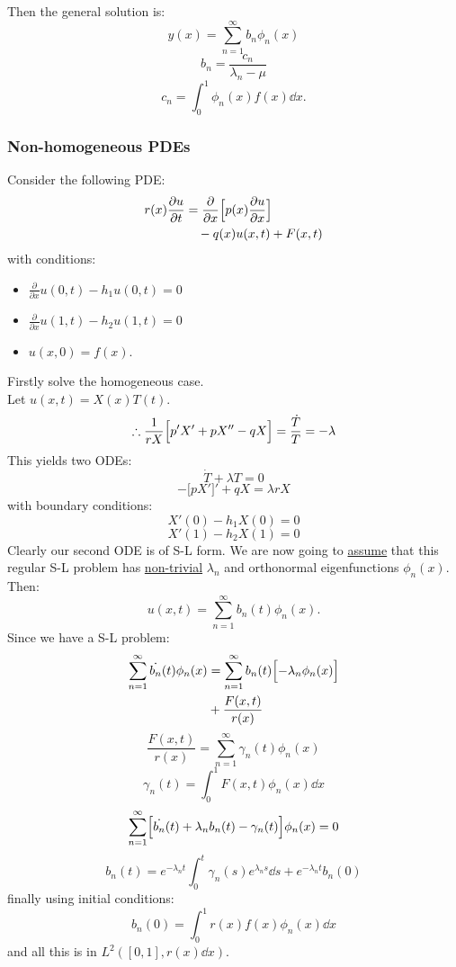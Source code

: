\documentclass{article}
\begin{document}
\begin{multicols}{3}
Then the general solution is:
$$y(x)=\sum_{n=1}^{\infty} b_n\phi_n(x)$$
$$b_n=\frac{c_n}{\lambda_n-\mu}$$
$$c_n=\int_{0}^{1}\phi_n(x)f(x)\dd x.$$

\subsubsection*{Non-homogeneous PDEs}
Consider the following PDE:
\begin{align*}
    r(x)\frac{\partial u}{\partial t}
    &=\frac{\partial}{\partial x}\Bigl[
    p(x)\frac{\partial u}{\partial x}
    \Bigr] \\
    &\quad-q(x)u(x,t)+F(x,t)
\end{align*}
with conditions:
\begin{itemize}
    \item $\displaystyle\frac{\partial}{\partial x}
    u(0,t)-h_1 u(0,t)=0$
    \item $\displaystyle\frac{\partial}{\partial x}
    u(1,t)-h_2 u(1,t)=0$
    \item $u(x,0)=f(x)$.
\end{itemize}
Firstly solve the homogeneous
case. \\ 
Let $u(x,t)=X(x)T(t)$.
$$\therefore\frac{1}{rX}\Bigl[p'X'+pX''
-qX\Bigr]=\frac{\dot{T}}{T}=-\lambda$$
This yields two ODEs:
$$\dot{T}+\lambda T=0$$
$$-\bigl[pX'\bigr]'+qX=\lambda rX$$
with boundary conditions:
$$X'(0)-h_1 X(0)=0$$
$$X'(1)-h_2 X(1)=0$$
Clearly our second ODE is of S-L form.
We are now going to \underline{assume} that this
regular S-L problem has \underline{non-trivial} $\lambda_n$
and orthonormal eigenfunctions $\phi_n(x)$. Then:
$$u(x,t)=\sum_{n=1}^{\infty}b_n(t)\phi_n(x).$$
Since we have a S-L problem:
\begin{align*} 
    \sum_{n=1}^{\infty}\dot{b_n}(t)\phi_n(x)
    &=\sum_{n=1}^{\infty}b_n(t)\Bigl[-\lambda_n\phi_n(x)\Bigr] \\
    &+\frac{F(x,t)}{r(x)}
\end{align*}
$$\frac{F(x,t)}{r(x)}=\sum_{n=1}^{\infty}\gamma_n(t)\phi_n(x)$$
$$\gamma_n(t)=\int_{0}^{1}F(x,t)\phi_n(x)\dd x$$
$$\sum_{n=1}^{\infty}\Bigl[\dot{b_n}(t)
+\lambda_n b_n(t)-\gamma_n(t)\Bigr]\phi_n(x)=0$$
$$b_n(t)=e^{-\lambda_n t}
\int_{0}^{t}\gamma_n(s)e^{\lambda_n s}\dd s
+e^{-\lambda_n t}b_n(0)$$
finally using initial conditions:
$$b_n(0)=\int_{0}^{1}r(x)f(x)\phi_n(x)\dd x$$
and all this is in $L^2([0,1],r(x)\dd x)$.


\end{multicols}
\end{document}
